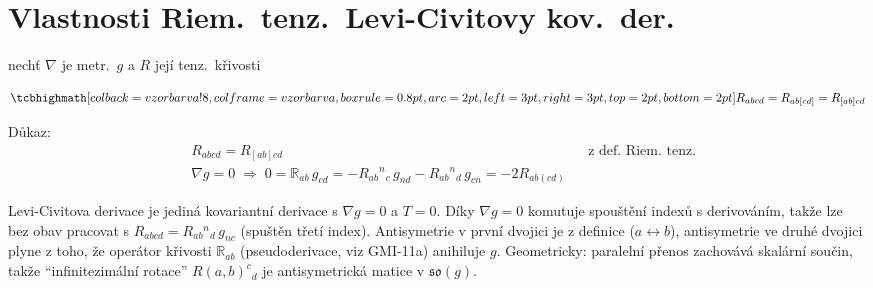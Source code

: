 \providecommand{\gmIjedenactBR}{\mathbb{R}}
\providecommand{\gmIjedenactBu}[1]{\underline{#1}}
\providecommand{\gmIjedenactBbA}[3]{\draw (#1-#3,#2) rectangle (#1+#3,#2+0.28);}
\providecommand{\gmIjedenactBbB}[3]{\draw (#1-#3,#2) rectangle (#1+#3,#2+0.28);
  \draw[decorate,decoration={zigzag,amplitude=0.8pt,segment length=2.2pt}] (#1-#3+0.07,#2+0.13)--(#1+#3-0.07,#2+0.13);}
\providecommand{\owedge}{\mathbin{\hat{\wedge}}}
\providecommand{\gmIjedenactBc}[1]{\overset{0}{\tikz[baseline=(X.base)]{\node[inner sep=0pt](X){$#1$};\draw(X.south west)--(X.north east);}}}
\providecommand{\gmIjedenactBd}[1]{\tikz[baseline=0.1cm,x=0.5cm,y=0.5cm,line width=0.5pt]{#1}}

\section{Vlastnosti Riem.\ tenz.\ Levi-Civitovy kov.\ der.}

nechť $\nabla$ je  metr.\ $g$ a $R$ její tenz.\ křivosti

\begin{veta}[Lemma]
\[
  \vzorec{R_{abcd} = R_{ab[cd]} = R_{[ab]cd}}
\]
\end{veta}
Důkaz:
\begin{align*}
  &R_{abcd} = R_{[ab]cd} && \text{z def.\ Riem.\ tenz.} \\
  &\nabla g = 0 \;\Rightarrow\; 0 = \gmIjedenactBR_{ab}\,g_{cd} = -R_{ab}{}^{n}{}_{c}\,g_{nd} - R_{ab}{}^{n}{}_{d}\,g_{cn} = -2R_{ab(cd)}
\end{align*}

\begin{vysvetleni}
Levi-Civitova derivace je jediná kovariantní derivace s $\nabla g=0$ a $T=0$. Díky $\nabla g=0$ komutuje spouštění indexů s derivováním, takže lze bez obav pracovat s $R_{abcd}=R_{ab}{}^{n}{}_{d}\,g_{nc}$ (spuštěn třetí index). Antisymetrie v první dvojici je z definice ($a\leftrightarrow b$), antisymetrie ve druhé dvojici plyne z toho, že operátor křivosti $\gmIjedenactBR_{ab}$ (pseudoderivace, viz GMI-11a) anihiluje $g$. Geometricky: paralelní přenos zachovává skalární součin, takže ``infinitezimální rotace'' $R(a,b)^{c}{}_{d}$ je antisymetrická matice v $\mathfrak{so}(g)$.
\end{vysvetleni}

